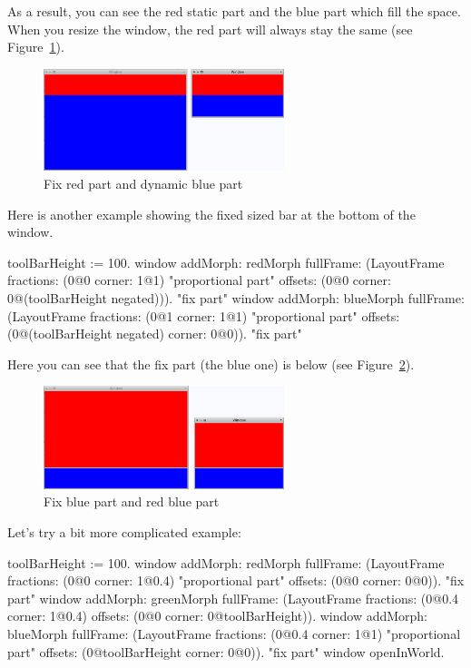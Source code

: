 \documentclass[a4paper,10pt,twoside]{book}
\begin{document}
As a result, you can see the red static part and the blue part which fill the space. When you resize the window, the red part will always stay the same (see Figure~\ref{fig:layoutFrame}).

\begin{figure}[ht]\centering
	\includegraphics[width=7cm]{LayoutFrame}
	\caption{Fix red part and dynamic blue part}
	\label{fig:layoutFrame}
\end{figure}

Here is another example showing the fixed sized bar at the bottom of the window.
\begin{code}{}
toolBarHeight := 100.
window
	addMorph: redMorph
	fullFrame: (LayoutFrame
				fractions: (0@0 corner: 1@1) "proportional part"
				offsets: (0@0 corner: 0@(toolBarHeight negated))). "fix part"
window
	addMorph: blueMorph
	fullFrame: (LayoutFrame
				fractions: (0@1 corner: 1@1) "proportional part"
				offsets: (0@(toolBarHeight negated) corner: 0@0)). "fix part"
\end{code}

Here you can see that the fix part (the blue one) is below (see Figure~\ref{fig:layoutFrame2}).

\begin{figure}[ht]\centering
	\includegraphics[width=7cm]{LayoutFrame2}
	\caption{Fix blue part and red blue part}
	\label{fig:layoutFrame2}
\end{figure}

Let's try a bit more complicated example:
\begin{code}{}
toolBarHeight := 100.
window
	addMorph: redMorph
	fullFrame: (LayoutFrame
				fractions: (0@0 corner: 1@0.4) "proportional part"
				offsets: (0@0 corner: 0@0)). "fix part"
window
	addMorph: greenMorph
	fullFrame: (LayoutFrame
				fractions: (0@0.4 corner: 1@0.4)
				offsets: (0@0 corner: 0@toolBarHeight)).				
window
	addMorph: blueMorph
	fullFrame: (LayoutFrame
				fractions: (0@0.4 corner: 1@1) "proportional part"
				offsets: (0@toolBarHeight corner: 0@0)). "fix part"
window openInWorld.
\end{code}
\end{document}
